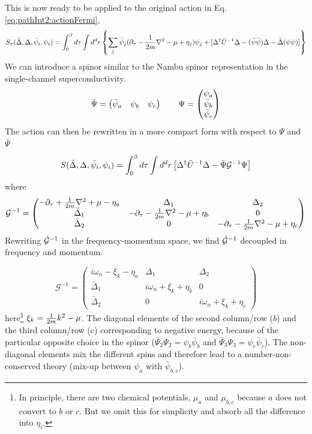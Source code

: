 This is now ready to be applied to the original action in Eq. \ref{eq:pathInt2:actionFermi}, 
\begin{equation}\label{eq:pathInt2:actionMix}
S_{\tau}(\bar\Delta,\Delta,\bar\psi_{i},\psi_{i})=\int^{\beta}_{0}d\tau\int{d^{d}r}\left\{\sum_{j}\bar\psi_{j}(\partial_\tau-\frac{1}{2m}\nabla^{2}-\mu+\eta_{j})\psi_{j}
+[\Delta^{\dagger}\tilde{U}^{-1}\Delta-(\bar\psi\bar\psi)\Delta-\bar\Delta{}(\psi\psi)]\right\}
\end{equation}
We can introduce  a spinor similar to the Nambu spinor representation in the single-channel superconductivity.  
\begin{equation}
\bar\Psi=\begin{pmatrix}\bar\psi_{a}&\psi_{b}&\psi_{c}\end{pmatrix}\qquad\Psi=\begin{pmatrix}\psi_{a}\\\bar\psi_{b}\\\bar\psi_{c}\end{pmatrix}
\end{equation}
The action can then be rewritten in a more compact form with respect to $\Psi$ and $\bar\Psi$
\begin{equation}\label{eq:pathInt2:actionMixCompact}
S(\bar\Delta,\Delta,\bar\psi_{i},\psi_{i})=\int^{\beta}_{0}d\tau\int{d^{d}r}
	\left[\Delta^{\dagger}\tilde{U}^{-1}\Delta-\bar\Psi\mathcal{G}^{-1}\Psi\right]
\end{equation}
where 
\begin{equation}
\mathcal{G}^{-1}=
\begin{pmatrix}\label{eq:pathInt2:nGDelta}
-\partial_{\tau}+\frac{1}{2m}\nabla^{2}+\mu-\eta_{a}&\Delta_{1}&\Delta_{2}\\
\bar\Delta_{1}&-\partial_{\tau}-\frac{1}{2m}\nabla^{2}-\mu+\eta_{b}&0\\
\bar\Delta_{2}&0&-\partial_{\tau}-\frac{1}{2m}\nabla^{2}-\mu+\eta_{c}
\end{pmatrix}
\end{equation}
Rewriting  $\hat{\mathcal{G}}^{-1}$ in the frequency-momentum space, we find $\hat{\mathcal{G}}^{-1}$   decoupled in frequency and momentum. 

\begin{equation}\label{eq:pathInt2:nGDeltaK}
\mathcal{G}^{-1}=
\begin{pmatrix}
i\omega_{n}-\xi_{k}-\eta_{a}&\Delta_{1}&\Delta_{2}\\
\bar\Delta_{1}&i\omega_{n}+\xi_{k}+\eta_{b}&0\\
\bar\Delta_{2}&0&i\omega_{n}+\xi_{k}+\eta_{c}
\end{pmatrix}
\end{equation}
here\footnote{In principle, there are two chemical potentials, $\mu_{a}$ and $\mu_{b,c}$ because $a$ does not convert to $b$ or $c$.  But we omit this for simplicity and absorb all the difference into $\eta_{i}$.} $\xi_{k}=\frac{1}{2m}k^{2}-\mu$. The diagonal elements of the second column/row (${b}$) and the third column/row (${c}$) corresponding to negative energy, because of the particular opposite choice in the  spinor ($\bar\Psi_{2}\Psi_{2}=\psi_{b}\bar\psi_{b}$ and $\bar\Psi_{3}\Psi_{3}=\psi_{c}\bar\psi_{c}$).  The non-diagonal elements mix the different spins  and therefore lead to a number-non-conserved theory (mix-up between $\psi_{a}$ with $\bar{\psi}_{b,c}$).  

